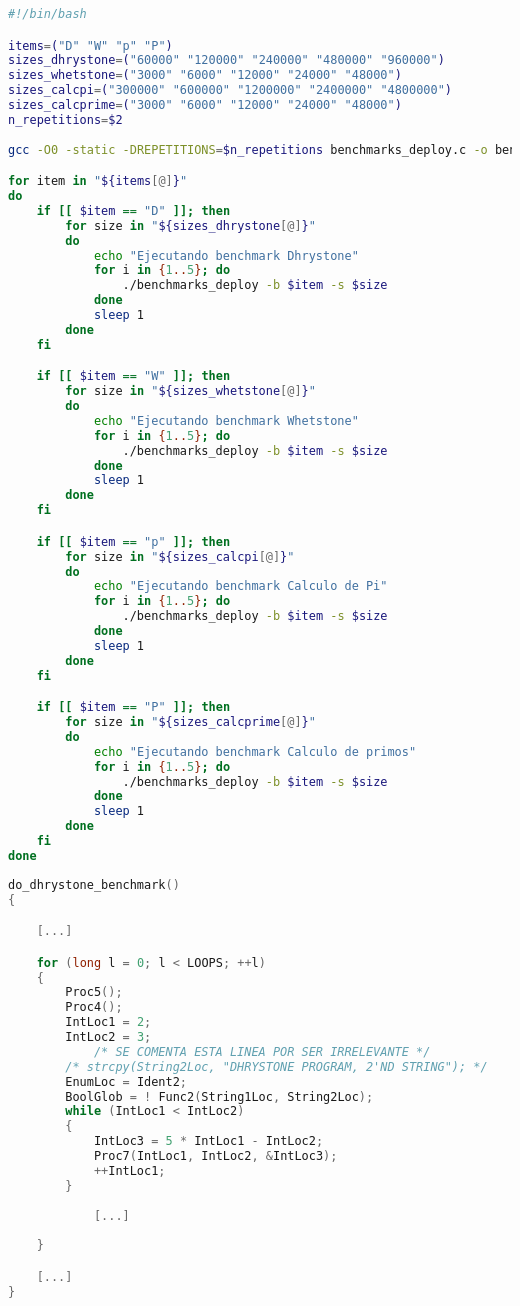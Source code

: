 \begin{lstlisting}[language=bash,frame=single,caption={Código fuente para el lanzamiento automático de pruebas},showstringspaces=false,label=lst:deploy-sh-papi]
#!/bin/bash

items=("D" "W" "p" "P")
sizes_dhrystone=("60000" "120000" "240000" "480000" "960000")
sizes_whetstone=("3000" "6000" "12000" "24000" "48000")
sizes_calcpi=("300000" "600000" "1200000" "2400000" "4800000")
sizes_calcprime=("3000" "6000" "12000" "24000" "48000")
n_repetitions=$2
    
gcc -O0 -static -DREPETITIONS=$n_repetitions benchmarks_deploy.c -o benchmarks_deploy -lm > /dev/null 2>&1

for item in "${items[@]}"
do
    if [[ $item == "D" ]]; then
        for size in "${sizes_dhrystone[@]}" 
        do
            echo "Ejecutando benchmark Dhrystone"
            for i in {1..5}; do
                ./benchmarks_deploy -b $item -s $size
            done
            sleep 1
        done
    fi

    if [[ $item == "W" ]]; then
        for size in "${sizes_whetstone[@]}" 
        do
            echo "Ejecutando benchmark Whetstone"
            for i in {1..5}; do
                ./benchmarks_deploy -b $item -s $size
            done
            sleep 1
        done
    fi

    if [[ $item == "p" ]]; then
        for size in "${sizes_calcpi[@]}" 
        do
            echo "Ejecutando benchmark Calculo de Pi"
            for i in {1..5}; do
                ./benchmarks_deploy -b $item -s $size
            done
            sleep 1
        done
    fi

    if [[ $item == "P" ]]; then
        for size in "${sizes_calcprime[@]}"
        do
            echo "Ejecutando benchmark Calculo de primos"
            for i in {1..5}; do
                ./benchmarks_deploy -b $item -s $size
            done
            sleep 1
        done
    fi
done
\end{lstlisting}

\begin{lstlisting}[language=C,caption={Fragmento de código optimizado Dhrystone},label=dhrystoneOpti,showstringspaces=false,frame=single]
do_dhrystone_benchmark()
{

    [...]

    for (long l = 0; l < LOOPS; ++l)
    {
        Proc5();
        Proc4();
        IntLoc1 = 2;
        IntLoc2 = 3;
            /* SE COMENTA ESTA LINEA POR SER IRRELEVANTE */
        /* strcpy(String2Loc, "DHRYSTONE PROGRAM, 2'ND STRING"); */
        EnumLoc = Ident2;
        BoolGlob = ! Func2(String1Loc, String2Loc);
        while (IntLoc1 < IntLoc2)
        {
            IntLoc3 = 5 * IntLoc1 - IntLoc2;
            Proc7(IntLoc1, IntLoc2, &IntLoc3);
            ++IntLoc1;
        }
    
            [...]
    
    }

    [...]
}
\end{lstlisting}
